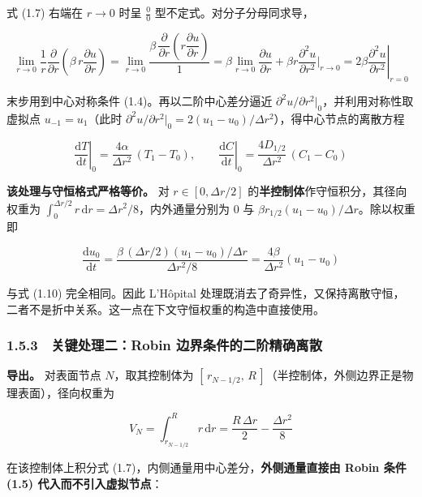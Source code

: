 \documentclass[12pt,a4paper]{ctexart}
\begin{document}
式 (1.7) 右端在 $r\to0$ 时呈 $\frac{0}{0}$ 型不定式。对分子分母同求导，

\begin{equation}
\lim_{r\to0}\frac{1}{r}\frac{\partial}{\partial r}\!\left(\beta\,r\frac{\partial u}{\partial r}\right)
=\lim_{r\to0}\frac{\beta\,\dfrac{\partial}{\partial r}\!\left(r\dfrac{\partial u}{\partial r}\right)}{1}
=\beta\lim_{r\to0}\frac{\partial u}{\partial r}+\beta r\frac{\partial^2 u}{\partial r^2}\Big|_{r\to0}
=2\beta\left.\frac{\partial^{2}u}{\partial r^{2}}\right|_{r=0}
\tag{1.9}
\end{equation}

末步用到中心对称条件 (1.4)。再以二阶中心差分逼近 $\partial^2u/\partial r^2|_0$，并利用对称性取虚拟点 $u_{-1}=u_1$（此时 $\partial^2u/\partial r^2|_0=2(u_1-u_0)/\Delta r^2$），得中心节点的离散方程

\begin{equation}
\left.\frac{\mathrm{d}T}{\mathrm{d}t}\right|_{0}=\frac{4\alpha}{\Delta r^{2}}\,(T_1-T_0),
\qquad
\left.\frac{\mathrm{d}C}{\mathrm{d}t}\right|_{0}=\frac{4D_{1/2}}{\Delta r^{2}}\,(C_1-C_0)
\tag{1.10}
\end{equation}

\textbf{该处理与守恒格式严格等价。} 对 $r\in[0,\Delta r/2]$ 的\textbf{半控制体}作守恒积分，其径向权重为 $\int_0^{\Delta r/2}r\,\mathrm{d}r=\Delta r^2/8$，内外通量分别为 $0$ 与 $\beta r_{1/2}(u_1-u_0)/\Delta r$。除以权重即

\[
\frac{\mathrm{d}u_0}{\mathrm{d}t}=\frac{\beta\,(\Delta r/2)(u_1-u_0)/\Delta r}{\Delta r^{2}/8}=\frac{4\beta}{\Delta r^{2}}(u_1-u_0)
\]

与式 (1.10) 完全相同。因此 L'Hôpital 处理既消去了奇异性，又保持离散守恒，二者不是折中关系。这一点在下文守恒权重的构造中直接使用。

\subsubsection*{1.5.3　关键处理二：Robin 边界条件的二阶精确离散}

\textbf{导出。} 对表面节点 $N$，取其控制体为 $[\,r_{N-1/2},\,R\,]$（半控制体，外侧边界正是物理表面），径向权重为

\begin{equation}
V_N=\int_{r_{N-1/2}}^{R}r\,\mathrm{d}r=\frac{R\,\Delta r}{2}-\frac{\Delta r^{2}}{8}
\tag{1.11}
\end{equation}

在该控制体上积分式 (1.7)，内侧通量用中心差分，\textbf{外侧通量直接由 Robin 条件 (1.5) 代入而不引入虚拟节点}：
\end{document}
